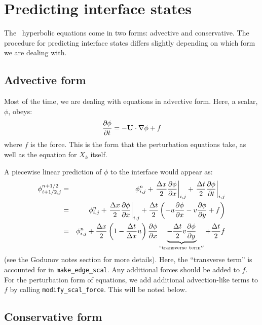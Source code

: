 
\section{Predicting interface states}

The \maestro\ hyperbolic equations come in two forms: advective and conservative.
The procedure for predicting interface states differs slightly depending on which
form we are dealing with.

\subsection{Advective form}

Most of the time, we are dealing with equations in advective form.
Here, a scalar, $\phi$, obeys:
\begin{equation}
\frac{\partial \phi}{\partial t} = -{\bf U} \cdot \nabla \phi + f
\end{equation}
where $f$ is the force.  This is the form that the perturbation
equations take, as well as the equation for $X_k$ itself.

A piecewise linear prediction of $\phi$ to the interface 
would appear as:
\begin{eqnarray}
\phi_{i+1/2,j}^{n+1/2} &=& \phi_{i,j}^n 
    + \left . \frac{\Delta x}{2} \frac{\partial \phi}{\partial x} \right |_{i,j}
    + \left . \frac{\Delta t}{2} \frac{\partial \phi}{\partial t} \right |_{i,j} \\
 &=& \phi_{i,j}^n 
    + \left . \frac{\Delta x}{2} \frac{\partial \phi}{\partial x} \right |_{i,j}
    +  \frac{\Delta t}{2} \left ( -u \frac{\partial \phi}{\partial x} 
                                         -v \frac{\partial \phi}{\partial y} + f \right ) \\
 &=& \phi_{i,j}^n + \frac{\Delta x}{2} \left ( 1 - \frac{\Delta t}{\Delta x} u \right ) 
           \frac{\partial \phi}{\partial x} 
    \underbrace{- \frac{\Delta t}{2} v \frac{\partial \phi}{\partial y}}_{\mathrm{``transverse~term''}} + \frac{\Delta t}{2} f
\end{eqnarray}
(see the Godunov notes section for more details).  Here, the
``transverse term'' is accounted for in {\tt make\_edge\_scal}.  Any
additional forces should be added to $f$.  For the perturbation form
of equations, we add additional advection-like terms to $f$ by calling
{\tt modify\_scal\_force}.  This will be noted below.

\subsection{Conservative form}

